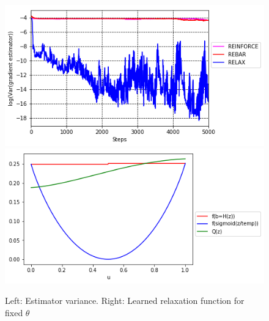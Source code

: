 \documentclass{article}
\begin{document}
\begin{figure}
\begin{center}
\includegraphics[scale=.33]{figures/variance_no_opt}
\includegraphics[scale=.33]{figures/learned_r}
\label{fig:toy_var}
\end{center}
\caption{Left: Estimator variance. Right: Learned relaxation function for fixed $\theta$}
\end{figure}
\end{document}
